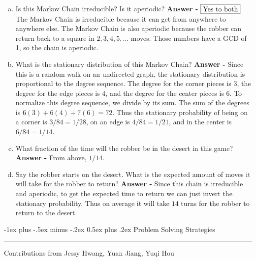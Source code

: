 \documentclass[10pt,landscape]{article}
\makeatletter
\theoremstyle{definition}
\renewcommand{\section}{\@startsection{section}{1}{0mm}%
                                {-1ex plus -.5ex minus -.2ex}%
                                {0.5ex plus .2ex}%
                                {\normalfont\large\bfseries}}
\makeatother
\begin{document}
\begin{multicols}{3}
\begin{enumerate}[a)]
    \item Is this Markov Chain irreducible? Is it aperiodic? \textbf{Answer - } $\boxed{\textnormal{Yes to both}}$ The Markov Chain is irreducible because it can get from anywhere to anywhere else. The Markov Chain is also aperiodic because the robber can return back to a square in $2, 3, 4, 5, \dots$ moves. Those numbers have a GCD of 1, so the chain is aperiodic.
    \item What is the stationary distribution of this Markov Chain? \textbf{Answer - }Since this is a random walk on an undirected graph, the stationary distribution is proportional to the degree sequence. The degree for the corner pieces is 3, the degree for the edge pieces is 4, and the degree for the center pieces is 6. To normalize this degree sequence, we divide by its sum. The sum of the degrees is $6(3) + 6(4) + 7(6) = 72$. Thus the stationary probability of being on a corner is $3/84 = 1/28$, on an edge is $4/84 =  1/21$, and in the center is $6/84 = 1/14$.
    \item What fraction of the time will the robber be in the desert in this game? \textbf{Answer - } From above, $\boxed{1/14}$.
    \item Say the robber starts on the desert. What is the expected amount of moves it will take for the robber to return? \textbf{Answer - } Since this chain is irreducible and aperiodic, to get the expected time to return we can just invert the stationary probability. Thus on average it will take $\boxed{14}$ turns for the robber to return to the desert.
\end{enumerate}


\section{Problem Solving Strategies} \smallskip \hrule height 2pt \smallskip

Contributions from Jessy Hwang, Yuan Jiang, Yuqi Hou


\end{multicols}
\end{document}
